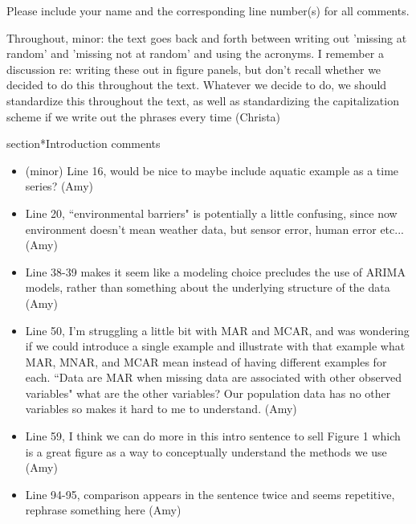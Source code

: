 Please include your name and the corresponding line number(s) for all comments.

Throughout, minor: the text goes back and forth between writing out 'missing at random' and 'missing not at random' and using the acronyms. I remember a discussion re: writing these out in figure panels, but don't recall whether we decided to do this throughout the text. Whatever we decide to do, we should standardize this throughout the text, as well as standardizing the capitalization scheme if we write out the phrases every time (Christa)

section*{Introduction comments}
\begin{itemize}
    \item (minor) Line 16, would be nice to maybe include aquatic example as a time series? (Amy)
    \item Line 20, ``environmental barriers" is potentially a little confusing, since now environment doesn't mean weather data, but sensor error, human error etc...(Amy)
    \item Line 38-39 makes it seem like a modeling choice precludes the use of ARIMA models, rather than something about the underlying structure of the data (Amy)
    \item Line 50, I'm struggling a little bit with MAR and MCAR, and was wondering if we could introduce a single example and illustrate with that example what MAR, MNAR, and MCAR mean instead of having different examples for each. ``Data are MAR when missing data are associated with other observed variables" what are the other variables? Our population data has no other variables so makes it hard to me to understand. (Amy)
    \item Line 59, I think we can do more in this intro sentence to sell Figure 1 which is a great figure as a way to conceptually understand the methods we use (Amy)
    \item Line 94-95, comparison appears in the sentence twice and seems repetitive, rephrase something here (Amy)
\end{itemize}

